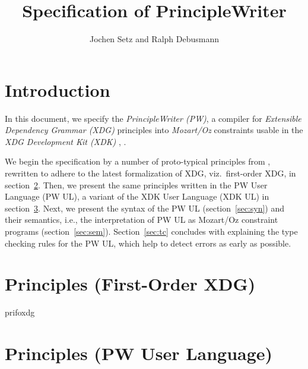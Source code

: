 



\title{Specification of PrincipleWriter}

\author{Jochen Setz and Ralph Debusmann}

\date{} 

\maketitle


\section{Introduction}\label{sec:intro}


In this document, we specify the \emph{PrincipleWriter (PW)}, a
compiler for \emph{Extensible Dependency Grammar (XDG)}
\cite{Debusmann06} principles into \emph{Mozart/Oz} \cite{Mozart07}
constraints usable in the \emph{XDG Development Kit (XDK)}
\cite{DebusmannEtal04MOZ}, \cite{DebusmannDuchier07XDK}.

We begin the specification by a number of proto-typical principles
from \cite{Debusmann06}, rewritten to adhere to the latest
formalization of XDG, viz.\ first-order XDG, in
section~\ref{sec:prifoxdg}. Then, we present the same principles
written in the PW User Language (PW UL), a variant of the XDK User
Language (XDK UL) in section~\ref{sec:priul}.  Next, we present the
syntax of the PW UL (section~\ref{sec:syn}) and their semantics, i.e.,
the interpretation of PW UL as Mozart/Oz constraint programs
(section~\ref{sec:sem}). Section~\ref{sec:tc} concludes with
explaining the type checking rules for the PW UL, which help to detect
errors as early as possible.


\section{Principles (First-Order XDG)}\label{sec:prifoxdg}

prifoxdg


\section{Principles (PW User Language)}\label{sec:priul}

